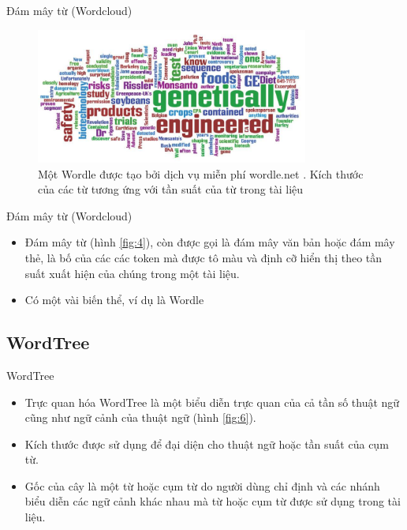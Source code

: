 \documentclass[10pt]{beamer}
\theoremstyle{remark}
\theoremstyle{definition}
\begin{document}
\begin{frame}{Đám mây từ (Wordcloud)}
	\begin{figure}[h!]
        \centering
        \includegraphics[width=0.8\textwidth]{5.png}
        \caption{Một Wordle được tạo bởi dịch vụ miễn phí wordle.net \cite{118}.
        Kích thước của các từ tương ứng với tần suất của từ trong tài liệu}
        \label{fig:5}
    \end{figure}
\end{frame}


\begin{frame}{Đám mây từ (Wordcloud)}
	\begin{itemize}
		\item Đám mây từ (hình \ref{fig:4}), còn được gọi là đám mây văn bản hoặc đám mây thẻ, là bố của các các token mà được tô màu và định cỡ hiển thị theo tần suất xuất hiện của chúng trong một tài liệu.
		\item Có một vài biến thể, ví dụ là Wordle
	\end{itemize}
\end{frame}

\subsection{WordTree}

\begin{frame}{WordTree}
	\begin{itemize}
		\item Trực quan hóa WordTree \cite{450} là một biểu diễn trực quan của cả tần số thuật ngữ cũng như ngữ cảnh của thuật ngữ (hình \ref{fig:6}).
		\item Kích thước được sử dụng để đại diện cho thuật ngữ hoặc tần suất của cụm từ.
		\item Gốc của cây là một từ hoặc cụm từ do người dùng chỉ định và các nhánh biểu diễn các ngữ cảnh khác nhau mà từ hoặc cụm từ được sử dụng trong tài liệu.
	\end{itemize}
\end{frame}
\end{document}
